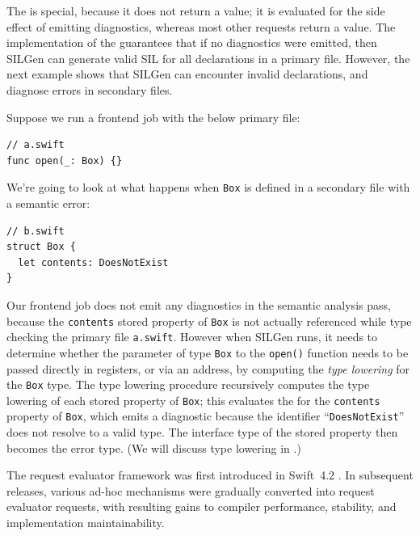 \documentclass[../generics]{subfiles}
\begin{document}
The  is special, because it does not return a value; it is evaluated for the side effect of emitting diagnostics, whereas most other requests return a value. The implementation of the  guarantees that if no diagnostics were emitted, then SILGen can generate valid SIL for all declarations in a primary file. However, the next example shows that SILGen can encounter invalid declarations, and diagnose errors in secondary files.

\begin{example}
Suppose we run a frontend job with the below primary file:
\begin{Verbatim}
// a.swift
func open(_: Box) {}
\end{Verbatim}
We're going to look at what happens when \texttt{Box} is defined in a secondary file with a semantic error:
\begin{Verbatim}
// b.swift
struct Box {
  let contents: DoesNotExist
}
\end{Verbatim}

Our frontend job does not emit any diagnostics in the semantic analysis pass, because the \texttt{contents} stored property of \texttt{Box} is not actually referenced while type checking the primary file \texttt{a.swift}. However when SILGen runs, it needs to determine whether the parameter of type \texttt{Box} to the \texttt{open()} function needs to be passed directly in registers, or via an address, by computing the \emph{type lowering} for the \texttt{Box} type. The type lowering procedure recursively computes the type lowering of each stored property of \texttt{Box}; this evaluates the  for the \texttt{contents} property of \texttt{Box}, which emits a diagnostic because the identifier ``\texttt{DoesNotExist}'' does not resolve to a valid type. The interface type of the stored property then becomes the error type. (We will discuss type lowering in .)
\end{example}

The request evaluator framework was first introduced in Swift~4.2 \cite{reqeval}. In subsequent releases, various ad-hoc mechanisms were gradually converted into request evaluator requests, with resulting gains to compiler performance, stability, and implementation maintainability.
\end{document}
